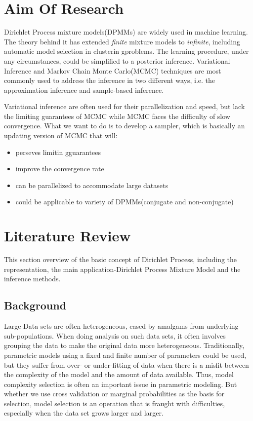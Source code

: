 \documentclass[a4paper,14pt]{article}
\begin{document}
\section{Aim Of Research}\label{aor}
Dirichlet Process mixture models(DPMMs) are widely used in machine learning. The theory behind it has extended \textit{finite} mixture models to \textit{infinite}, including automatic model selection in clusterin gproblems. The learning procedure, under any circumstances, could be simplified to a posterior inference. Variational Inference and Markov Chain Monte Carlo(MCMC) techniques are most commonly used to address the inference in two different ways, i.e. the approximation inference and sample-based inference.

Variational inference are often used for their parallelization and speed, but lack the limiting guarantees of MCMC while MCMC faces the difficulty of slow convergence. What we want to do is to develop a sampler, which is basically an updating version of MCMC that will:
\begin{itemize}
	\item perseves limitin gguarantees
	\item improve the convergence rate
	\item can be parallelized to accommodate large datasets
	\item could be applicable to variety of DPMMs(conjugate and non-conjugate)
\end{itemize} 
\section{Literature Review}
This section overview of the basic concept of Dirichlet Process, including the representation, the main application-Dirichlet Process Mixture Model and the inference methods.  
\newcommand{\argmax}[1]{\underset{#1}{\operatorname{arg}\,\operatorname{max}}\;}
\newcommand{\argmin}[1]{\underset{#1}{\operatorname{arg}\,\operatorname{min}}\;}
\subsection{Background}
Large Data sets are often heterogeneous, cased by amalgams from underlying sub-populations\cite{muller2004nonparametric}. When doing analysis on such data sets, it often involves grouping the data to make the original data more heterogeneous. Traditionally, parametric models using a fixed and finite number of parameters could be used, but they suffer from over- or under-fitting of data when there is a misfit between the complexity of the model and the amount of data available. Thus, model complexity selection is often an important issue in parametric modeling. But whether we use cross validation or marginal probabilities as the basis for selection, model selection is an operation that is fraught with difficulties\cite{Wasserman2000}, especially when the data set grows larger and larger. 
\end{document}
